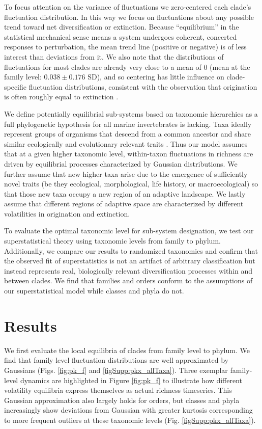 \documentclass[12pt]{article}
\let\citep=\cite
\begin{document}
To focus attention on the variance of fluctuations we zero-centered
each clade's fluctuation distribution. In this way we focus on
fluctuations about any possible trend toward net diversification or
extinction. Because ``equilibrium'' in the statistical mechanical
sense means a system undergoes coherent, concerted responses to
perturbation, the mean trend line (positive or negative) is of less
interest than deviations from it. We also note that the distributions
of fluctuations for most clades are already very close to a mean of 0
(mean at the family level: $0.038 \pm 0.176 \text{ SD}$), and so
centering has little influence on clade-specific fluctuation
distributions, consistent with the observation that origination is
often roughly equal to extinction \citep{foote2010Chapter}.

We define potentially equilibrial sub-systems based on taxonomic
hierarchies as a full phylogenetic hypothesis for all marine
invertebrates is lacking.  Taxa ideally represent groups of organisms
that descend from a common ancestor and share similar ecologically and
evolutionary relevant traits \citep{mayr1965systZool, erwin2007}. Thus
our model assumes that at a given higher taxonomic level, within-taxon
fluctuations in richness are driven by equilibrial processes
characterized by Gaussian distributions. We further assume that new
higher taxa arise due to the emergence of sufficiently novel traits
(be they ecological, morphological, life history, or macroecological)
so that those new taxa occupy a new region of an adaptive
landscape. We lastly assume that different regions of adaptive space
are characterized by different volatilities in origination and
extinction.

To evaluate the optimal taxonomic level for sub-system designation, we
test our superstatistical theory using taxonomic levels from family to
phylum. Additionally, we compare our results to randomized taxonomies
and confirm that the observed fit of superstatistics is not an
artifact of arbitrary classification but instead represents real,
biologically relevant diversification processes within and between
clades. We find that families and orders conform to the assumptions of
our superstatistical model while classes and phyla do not.

\section{Results}

We first evaluate the local equilibria of clades from family level to
phylum. We find that family level fluctuation distributions are well
approximated by Gaussians (Figs. \ref{fig:pk_f} and
\ref{figSupp:pkx_allTaxa}).  Three exemplar family-level dynamics are
highlighted in Figure \ref{fig:pk_f} to illustrate how different
volatility equilibria express themselves as actual richness
timeseries.  This Gaussian approximation also largely holds for
orders, but classes and phyla increasingly show deviations from
Gaussian with greater kurtosis corresponding to more frequent outliers
at these taxonomic levels (Fig. \ref{figSupp:pkx_allTaxa}).
\end{document}
